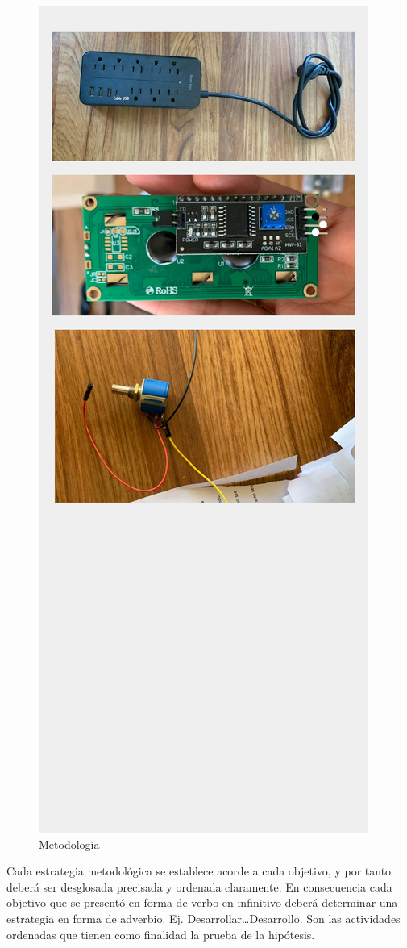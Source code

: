     \begin{figure}[H]
        \centering
        \includegraphics[trim = {5mm 180mm 5mm 30mm},clip,scale=0.4]{16/Img/Instructivo C.E (4).pdf}
        \caption{Metodología}
        \label{fig:metodología}
    \end{figure}
    Cada estrategia metodológica se establece acorde a cada objetivo, y por tanto deberá ser desglosada precisada y ordenada claramente. En consecuencia cada objetivo que se presentó en forma de verbo en infinitivo deberá determinar una estrategia en forma de adverbio. Ej. Desarrollar…Desarrollo. Son las actividades ordenadas que tienen como finalidad la prueba de la hipótesis. 
    
